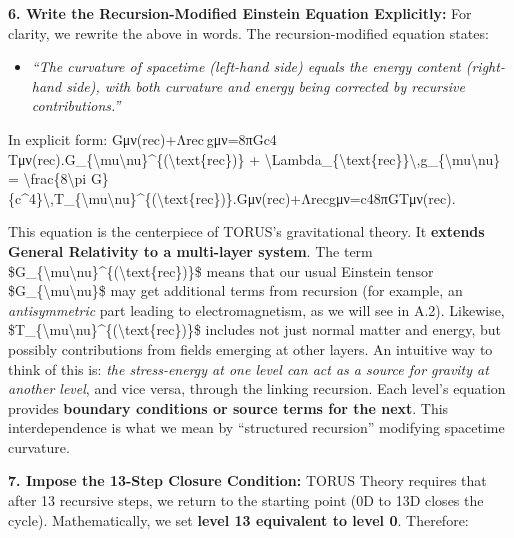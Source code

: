 \documentclass[
]{article}
\begin{document}
\textbf{6. Write the Recursion-Modified Einstein Equation Explicitly:}
For clarity, we rewrite the above in words. The recursion-modified
equation states\hspace{0pt}:

\begin{itemize}
\item
  \emph{``The curvature of spacetime (left-hand side) equals the energy
  content (right-hand side), with both curvature and energy being
  corrected by recursive contributions.''}
\end{itemize}

In explicit form:
Gμν(rec)+Λrec gμν=8πGc4 Tμν(rec).G\_\{\textbackslash mu\textbackslash nu\}\^{}\{(\textbackslash text\{rec\})\}
+
\textbackslash Lambda\_\{\textbackslash text\{rec\}\}\textbackslash,g\_\{\textbackslash mu\textbackslash nu\}
= \textbackslash frac\{8\textbackslash pi
G\}\{c\^{}4\}\textbackslash,T\_\{\textbackslash mu\textbackslash nu\}\^{}\{(\textbackslash text\{rec\})\}.Gμν(rec)\hspace{0pt}+Λrec\hspace{0pt}gμν\hspace{0pt}=c48πG\hspace{0pt}Tμν(rec)\hspace{0pt}.

This equation is the centerpiece of TORUS's gravitational theory. It
\textbf{extends General Relativity to a multi-layer system}. The term
\$G\_\{\textbackslash mu\textbackslash nu\}\^{}\{(\textbackslash text\{rec\})\}\$
means that our usual Einstein tensor
\$G\_\{\textbackslash mu\textbackslash nu\}\$ may get additional terms
from recursion (for example, an \emph{antisymmetric} part leading to
electromagnetism, as we will see in A.2). Likewise,
\$T\_\{\textbackslash mu\textbackslash nu\}\^{}\{(\textbackslash text\{rec\})\}\$
includes not just normal matter and energy, but possibly contributions
from fields emerging at other layers. An intuitive way to think of this
is: \emph{the stress-energy at one level can act as a source for gravity
at another level}, and vice versa, through the linking recursion. Each
level's equation provides \textbf{boundary conditions or source terms
for the next}\hspace{0pt}. This interdependence is what we mean by
``structured recursion'' modifying spacetime curvature.

\textbf{7. Impose the 13-Step Closure Condition:} TORUS Theory requires
that after 13 recursive steps, we return to the starting point (0D to
13D closes the cycle). Mathematically, we set \textbf{level 13
equivalent to level 0}. Therefore:
\end{document}

